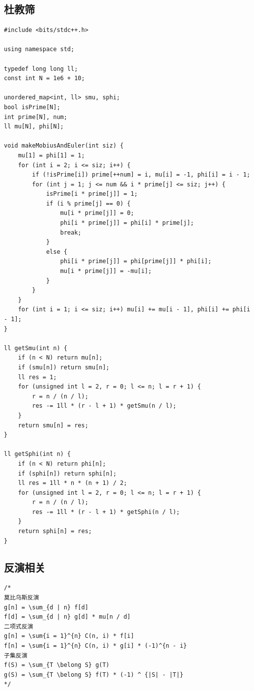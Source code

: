 \documentclass[twoside]{article}
\begin{document}
\subsection{杜教筛}
\begin{lstlisting}
#include <bits/stdc++.h>

using namespace std;

typedef long long ll;
const int N = 1e6 + 10;

unordered_map<int, ll> smu, sphi;
bool isPrime[N];
int prime[N], num;
ll mu[N], phi[N];

void makeMobiusAndEuler(int siz) {
    mu[1] = phi[1] = 1;
    for (int i = 2; i <= siz; i++) {
        if (!isPrime[i]) prime[++num] = i, mu[i] = -1, phi[i] = i - 1;
        for (int j = 1; j <= num && i * prime[j] <= siz; j++) {
            isPrime[i * prime[j]] = 1;
            if (i % prime[j] == 0) {
                mu[i * prime[j]] = 0;
                phi[i * prime[j]] = phi[i] * prime[j];
                break;
            }
            else {
                phi[i * prime[j]] = phi[prime[j]] * phi[i];
                mu[i * prime[j]] = -mu[i];
            }
        }
    }
    for (int i = 1; i <= siz; i++) mu[i] += mu[i - 1], phi[i] += phi[i - 1];
}

ll getSmu(int n) {
    if (n < N) return mu[n];
    if (smu[n]) return smu[n];
    ll res = 1;
    for (unsigned int l = 2, r = 0; l <= n; l = r + 1) {
        r = n / (n / l);
        res -= 1ll * (r - l + 1) * getSmu(n / l);
    }
    return smu[n] = res;
}

ll getSphi(int n) {
    if (n < N) return phi[n];
    if (sphi[n]) return sphi[n];
    ll res = 1ll * n * (n + 1) / 2;
    for (unsigned int l = 2, r = 0; l <= n; l = r + 1) {
        r = n / (n / l);
        res -= 1ll * (r - l + 1) * getSphi(n / l);
    }
    return sphi[n] = res;
}
\end{lstlisting}
\subsection{反演相关}
\begin{lstlisting}
/*
莫比乌斯反演
g[n] = \sum_{d | n} f[d]
f[d] = \sum_{d | n} g[d] * mu[n / d]
二项式反演
g[n] = \sum{i = 1}^{n} C(n, i) * f[i]
f[n] = \sum{i = 1}^{n} C(n, i) * g[i] * (-1)^{n - i}
子集反演
f(S) = \sum_{T \belong S} g(T)
g(S) = \sum_{T \belong S} f(T) * (-1) ^ {|S| - |T|}
*/
\end{lstlisting}
\end{document}

